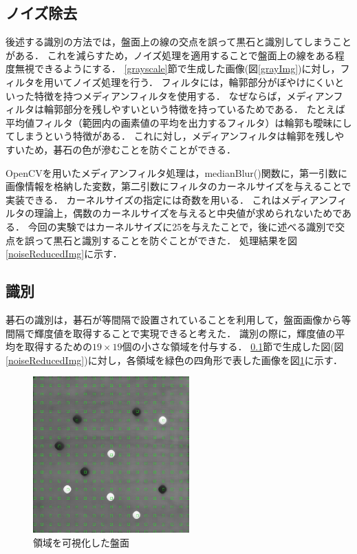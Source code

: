 \documentclass[openright]{nitocs}
\numberwithin{equation}{section}
\begin{document}
        \subsection{ノイズ除去} \label{noiseReduce}
            後述する識別の方法では，盤面上の線の交点を誤って黒石と識別してしまうことがある．
            これを減らすため，ノイズ処理を適用することで盤面上の線をある程度無視できるようにする． 
            \ref{grayscale}節で生成した画像(図\ref{grayImg})に対し，フィルタを用いてノイズ処理を行う．
            フィルタには，輪郭部分がぼやけにくいといった特徴を持つメディアンフィルタを使用する．
            なぜならば，メディアンフィルタは輪郭部分を残しやすいという特徴を持っているためである．
            たとえば平均値フィルタ（範囲内の画素値の平均を出力するフィルタ）は輪郭も曖昧にしてしまうという特徴がある．
            これに対し，メディアンフィルタは輪郭を残しやすいため，碁石の色が滲むことを防ぐことができる．
    
            OpenCVを用いたメディアンフィルタ処理は，medianBlur()関数に，第一引数に画像情報を格納した変数，第二引数にフィルタのカーネルサイズを与えることで実装できる．
            カーネルサイズの指定には奇数を用いる．
            これはメディアンフィルタの理論上，偶数のカーネルサイズを与えると中央値が求められないためである．
            今回の実験ではカーネルサイズに25を与えたことで，後に述べる識別で交点を誤って黒石と識別することを防ぐことができた．
            処理結果を図\ref{noiseReducedImg}に示す．

        \subsection{識別}
            \label{area}
            碁石の識別は，碁石が等間隔で設置されていることを利用して，盤面画像から等間隔で輝度値を取得することで実現できると考えた．%
            識別の際に，輝度値の平均を取得するための$19\times19$個の小さな領域を付与する．
            \ref{noiseReduce}節で生成した図(図\ref{noiseReducedImg})に対し，各領域を緑色の四角形で表した画像を図\ref{boardWithArea}に示す．
            \begin{figure}[tb] %
                \begin{center}
                \includegraphics[clip,width=60mm]{DSC_0041/boardWithAreaImg.jpg} 
                \caption{領域を可視化した盤面}
                \label{boardWithArea}
                \end{center}
            \end{figure}
\end{document}
